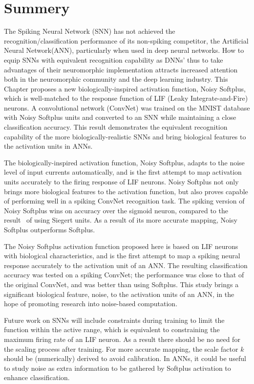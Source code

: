 \section{Summery}
	The Spiking Neural Network (SNN) has not achieved the recognition/classification performance of its non-spiking competitor, the Artificial Neural Network(ANN), particularly when used in deep neural networks.
	How to equip SNNs with equivalent recognition capability as DNNs' thus to take advantages of their neuromorphic implementation attracts increased attention both in the neuromorphic community and the deep learning industry.
	This Chapter proposes a new biologically-inspired activation function, Noisy Softplus, which is well-matched to the response function of LIF (Leaky Integrate-and-Fire) neurons.
	A convolutional network (ConvNet) was trained on the MNIST database with Noisy Softplus units and converted to an SNN while maintaining a close classification accuracy.
	This result demonstrates the equivalent recognition capability of the more biologically-realistic SNNs and bring biological features to the activation units in ANNs.
	
	The biologically-inspired activation function, Noisy Softplus, adapts to the noise level of input currents automatically, and is the first attempt to map activation units accurately to the firing response of LIF neurons.
	Noisy Softplus not only brings more biological features to the activation function, but also proves capable of performing well in a spiking ConvNet recognition task.
	The spiking version of Noisy Softplus wins on accuracy over the sigmoid neuron, compared to the result~\cite{Stromatias2015scalable} of using Siegert units.
	As a result of its more accurate mapping, Noisy Softplus outperforms Softplus.
	
	The Noisy Softplus activation function proposed here is based on LIF neurons with biological characteristics, and is the first attempt to map a spiking neural response accurately to the activation unit of an ANN.
	The resulting classification accuracy was tested on a spiking ConvNet; the performance was close to that of the original ConvNet, and was better than using Softplus.
	This study brings a significant biological feature, noise, to the activation units of an ANN, in the hope of promoting research into noise-based computation.
	
	Future work on SNNs will include constraints during training to limit the function within the active range, which is equivalent to constraining the maximum firing rate of an LIF neuron.
	As a result there should be no need for the scaling process after training.
	For more accurate mapping, the scale factor $k$ should be (numerically) derived to avoid calibration.
	In ANNs, it could be useful to study noise as extra information to be gathered by Softplus activation to enhance classification.